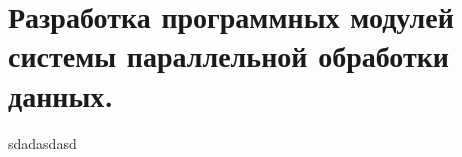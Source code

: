 \newpage


\section{Разработка программных модулей системы параллельной обработки данных.}\label{sec:devProgParallel}
sdadasdasd